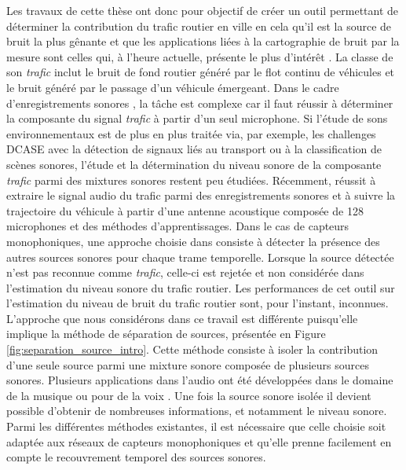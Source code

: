 
Les travaux de cette thèse ont donc pour objectif de créer un outil permettant de déterminer la contribution du trafic routier en ville en cela qu'il est la source de bruit la plus gênante et que les applications liées à la cartographie de bruit par la mesure sont celles qui, à l'heure actuelle, présente le plus d'intérêt \cite{jagniatinskis2014assessment}. La classe de son \textit{trafic} inclut le bruit de fond routier généré par le flot continu de véhicules et le bruit généré par le passage d'un véhicule émergeant.
Dans le cadre d'enregistrements sonores , la tâche est complexe car il faut réussir à déterminer la composante du signal \textit{trafic} à partir d'un seul microphone. Si l'étude de sons environnementaux est de plus en plus traitée via, par exemple, les challenges DCASE \cite{stowell2015detection,mesaros2017dcase} avec la détection de signaux liés au transport ou à la classification de scènes sonores, l'étude et la détermination du niveau sonore de la composante \textit{trafic} parmi des mixtures sonores restent peu étudiées. Récemment, \cite{leiba2017large} réussit à extraire le signal audio du trafic parmi des enregistrements sonores et à suivre la trajectoire du véhicule à partir d'une antenne acoustique composée de 128 microphones et des méthodes d'apprentissages.
Dans le cas de capteurs monophoniques, une approche choisie dans \cite{socoro2017anomalous} consiste à détecter la présence des autres sources sonores pour chaque trame temporelle. Lorsque la source détectée n'est pas reconnue comme \textit{trafic}, celle-ci est rejetée et non considérée dans l'estimation du niveau sonore du trafic routier. Les performances de cet outil sur l'estimation du niveau de bruit du trafic routier sont, pour l'instant, inconnues.
L'approche que nous considérons dans ce travail est différente puisqu'elle implique la méthode de séparation de sources, présentée en Figure \ref{fig:separation_source_intro}. Cette méthode consiste à isoler la contribution d'une seule source parmi une mixture sonore composée de plusieurs sources sonores. Plusieurs applications dans l'audio ont été développées dans le domaine de la musique \cite{smaragdis_non-negative_2003,virtanen_monaural_2007} ou pour de la voix \cite{weninger2012supervised,yilmaz2004blind}. Une fois la source sonore isolée il devient possible d'obtenir de nombreuses informations, et notamment le niveau sonore. Parmi les différentes méthodes existantes, il est nécessaire que celle choisie soit adaptée aux réseaux de capteurs monophoniques et qu'elle prenne facilement en compte le recouvrement temporel des sources sonores.

